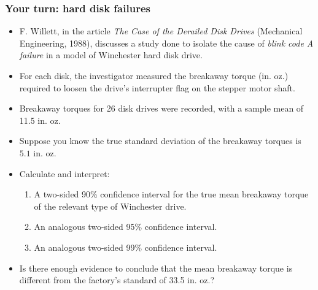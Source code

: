 \documentclass[handout]{beamer}\usepackage[]{graphicx}\usepackage[]{color}
\numberwithin{equation}{section}
\begin{document}
\begin{frame}
\frametitle{Your turn: hard disk failures} \scriptsize
\begin{itemize}
\item F. Willett, in the article \emph{The Case of the Derailed Disk Drives} (Mechanical Engineering, 1988), discusses a study done to isolate the cause of \emph{blink code A failure} in a model of Winchester hard disk drive. 
\pause \item For each disk, the investigator measured the breakaway torque (in. oz.) required to loosen the drive's interrupter flag on the stepper motor shaft.
\pause \item Breakaway torques for 26 disk drives were recorded, with a sample mean of 11.5 in. oz.
\pause \item Suppose you know the true standard deviation of the breakaway torques is $5.1$ in. oz.
\pause \item Calculate and interpret:
\begin{enumerate}[1. ]
\pause \item A two-sided 90\% confidence interval for the true mean breakaway torque of the relevant type of Winchester drive.
\pause \item An analogous two-sided 95\% confidence interval. 
\pause \item An analogous two-sided 99\% confidence interval. 
\end{enumerate}
\pause \item Is there enough evidence to conclude that the mean breakaway torque is different from the factory's standard of 33.5 in. oz.?
\end{itemize}
\end{frame}
\end{document}
